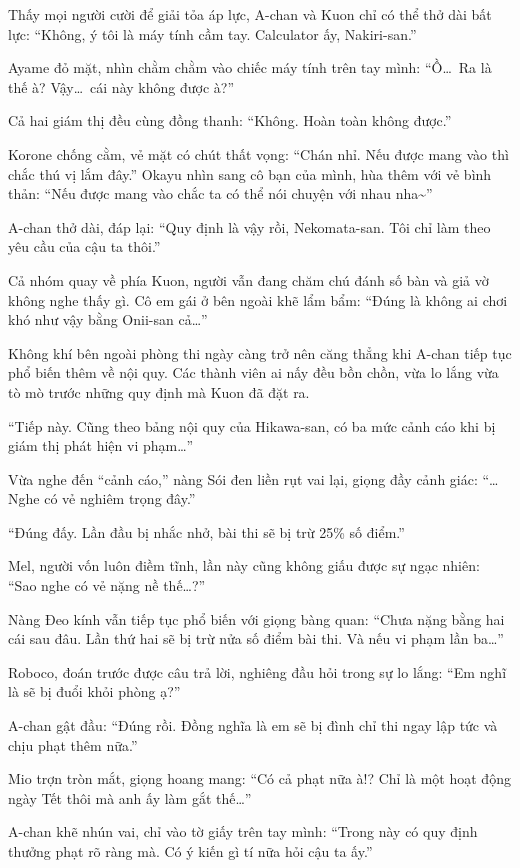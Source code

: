 \documentclass[../main.tex]{subfiles}
\begin{document}
Thấy mọi người cười để giải tỏa áp lực, A-chan và Kuon chỉ có thể thở dài bất lực: ``Không, ý tôi là máy tính cầm tay. Calculator ấy, Nakiri-san.''

Ayame đỏ mặt, nhìn chằm chằm vào chiếc máy tính trên tay mình: ``Ồ\dots\ Ra là thế à? Vậy\dots\ cái này không được à?''

Cả hai giám thị đều cùng đồng thanh: ``Không. Hoàn toàn không được.''

Korone chống cằm, vẻ mặt có chút thất vọng: ``Chán nhỉ. Nếu được mang vào thì chắc thú vị lắm đây.'' Okayu nhìn sang cô bạn của mình, hùa thêm với vẻ bình thản: ``Nếu được mang vào chắc ta có thể nói chuyện với nhau nha\~{}''

A-chan thở dài, đáp lại: ``Quy định là vậy rồi, Nekomata-san. Tôi chỉ làm theo yêu cầu của cậu ta thôi.''

Cả nhóm quay về phía Kuon, người vẫn đang chăm chú đánh số bàn và giả vờ không nghe thấy gì. Cô em gái ở bên ngoài khẽ lẩm bẩm: ``Đúng là không ai chơi khó như vậy bằng Onii-san cả\dots''

Không khí bên ngoài phòng thi ngày càng trở nên căng thẳng khi A-chan tiếp tục phổ biến thêm về nội quy. Các thành viên ai nấy đều bồn chồn, vừa lo lắng vừa tò mò trước những quy định mà Kuon đã đặt ra.

``Tiếp này. Cũng theo bảng nội quy của Hikawa-san, có ba mức cảnh cáo khi bị giám thị phát hiện vi phạm\dots''

Vừa nghe đến ``cảnh cáo,'' nàng Sói đen liền rụt vai lại, giọng đầy cảnh giác: ``\dots Nghe có vẻ nghiêm trọng đây.''

``Đúng đấy. Lần đầu bị nhắc nhở, bài thi sẽ bị trừ 25\% số điểm.''

Mel, người vốn luôn điềm tĩnh, lần này cũng không giấu được sự ngạc nhiên: ``Sao nghe có vẻ nặng nề thế\dots?''

Nàng Đeo kính vẫn tiếp tục phổ biến với giọng bàng quan: ``Chưa nặng bằng hai cái sau đâu. Lần thứ hai sẽ bị trừ nửa số điểm bài thi. Và nếu vi phạm lần ba\dots''

Roboco, đoán trước được câu trả lời, nghiêng đầu hỏi trong sự lo lắng: ``Em nghĩ là sẽ bị đuổi khỏi phòng ạ?''

A-chan gật đầu: ``Đúng rồi. Đồng nghĩa là em sẽ bị đình chỉ thi ngay lập tức và chịu phạt thêm nữa.''

Mio trợn tròn mắt, giọng hoang mang: ``Có cả phạt nữa à!? Chỉ là một hoạt động ngày Tết thôi mà anh ấy làm gắt thế\dots''

A-chan khẽ nhún vai, chỉ vào tờ giấy trên tay mình: ``Trong này có quy định thưởng phạt rõ ràng mà. Có ý kiến gì tí nữa hỏi cậu ta ấy.''
\end{document}
